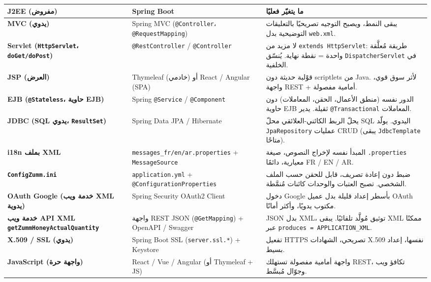 \begin{xltabular}{\textwidth}{>{\bfseries}p{3cm} p{3.4cm} X}
\toprule
\textbf{J2EE (مفروض)} & \textbf{Spring Boot} & \textbf{ما يتغيّر فعليًا} \\
\midrule
\endhead
MVC (يدوي) & Spring MVC (\texttt{@Controller}، \texttt{@RequestMapping}) & يبقى النمط، ويصبح التوجيه تصريحيًا بالتعليقات التوضيحية بدل \texttt{web.xml}. \\
Servlet (\texttt{HttpServlet}، \texttt{doGet/doPost}) & \texttt{@RestController} / \texttt{@Controller} & لا مزيد من \texttt{extends HttpServlet}: طريقة مُعلَّقة واحدة = نقطة نهاية. يُنسّق \texttt{DispatcherServlet} في الخلفية. \\
JSP (العرض) & Thymeleaf (خادمي) أو React / Angular (SPA) & قوْلبة حديثة دون scriptlets من Java. لأثر سوق قوي، واجهة REST + أمامية مفصولة. \\
EJB (\texttt{@Stateless}، حاوية EJB) & Spring \texttt{@Service} / \texttt{@Component} & الدور نفسه (منطق الأعمال، الحقن، المعاملات) دون حاوية EJB ثقيلة. يدير \texttt{@Transactional} المعاملات. \\
JDBC (SQL يدوي، \texttt{ResultSet}) & Spring Data JPA / Hibernate & يحلّ الربط الكائني-العلائقي محلّ SQL اليدوي. يولّد \texttt{JpaRepository} عمليات CRUD (يبقى \texttt{JdbcTemplate} متاحًا). \\
i18n بملف XML & \texttt{messages\_fr/\allowbreak en/\allowbreak ar\allowbreak .properties} + \texttt{MessageSource} & المبدأ نفسه لإخراج النصوص، صيغة \texttt{.properties} معيارية، دائمًا FR / EN / AR. \\
\texttt{ConfigZumm.ini} & \texttt{application.yml} + \texttt{@Configuration\allowbreak Properties} & ضبط دون إعادة تصريف، قابل للحقن حسب الملف الشخصي. تصبح العتبات والوحدات كائنات مُنمَّطة. \\
OAuth Google (خدمة ويب XML يدوية) & Spring Security OAuth2 Client & دخول Google بأسطر إعداد قليلة بدل عميل OAuth مكتوب يدويًا، وأكثر أمانًا. \\
خدمة ويب API XML \texttt{getZumm\allowbreak Honey\allowbreak Actual\allowbreak Quantity} & واجهة REST JSON (\texttt{@GetMapping}) + OpenAPI / Swagger & JSON بدل XML، توثيق مُولَّد تلقائيًا. يبقى XML ممكنًا عبر \texttt{produces = APPLICATION\_XML}. \\
X.509 / SSL (يدوي) & Spring Boot SSL (\texttt{server.ssl.*}) + Keystore & تفعيل HTTPS تصريحي، الشهادات X.509 نفسها، إعداد بسيط. \\
JavaScript (واجهة حرة) & React / Vue / Angular (أو Thymeleaf + JS) & واجهة أمامية مفصولة تستهلك REST، تكافؤ ويب وجوّال مُبسَّط. \\
\bottomrule
\end{xltabular}

